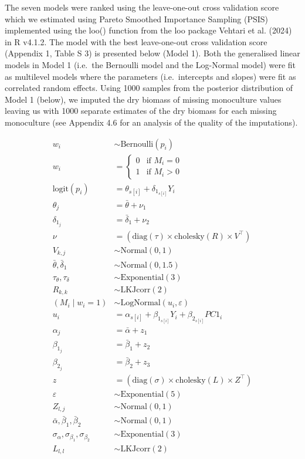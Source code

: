 \documentclass[
  letterpaper,
  DIV=11,
  numbers=noendperiod]{scrartcl}
\begin{document}
The seven models were ranked using the leave-one-out cross validation
score which we estimated using Pareto Smoothed Importance Sampling
(PSIS) implemented using the loo() function from the loo package Vehtari
et al. (2024) in R v4.1.2. The model with the best leave-one-out cross
validation score (Appendix 1, Table S 3) is presented below (Model 1).
Both the generalised linear models in Model 1 (i.e.~the Bernoulli model
and the Log-Normal model) were fit as multilevel models where the
parameters (i.e.~intercepts and slopes) were fit as correlated random
effects. Using 1000 samples from the posterior distribution of Model 1
(below), we imputed the dry biomass of missing monoculture values
leaving us with 1000 separate estimates of the dry biomass for each
missing monoculture (see Appendix 4.6 for an analysis of the quality of
the imputations).

\[
\begin{aligned}
w_i &\sim \text{Bernoulli}(p_i) \\
w_i &= 
\begin{cases}
0 & \text{if } M_i = 0 \\
1 & \text{if } M_i > 0
\end{cases} \\
\text{logit}(p_i) &= \theta_{s[i]} + \delta_{1_{s[i]}} Y_i \\
\theta_j &= \bar{\theta} + \nu_1 \\
\delta_{1_j} &= \bar{\delta}_1 + \nu_2 \\
\nu &= \left( \text{diag}(\tau) \times \text{cholesky}(R) \times V^\top \right) \\
V_{k,j} &\sim \text{Normal}(0, 1) \\
\bar{\theta}, \bar{\delta}_1 &\sim \text{Normal}(0, 1.5) \\
\tau_\theta, \tau_\delta &\sim \text{Exponential}(3) \\
R_{k,k} &\sim \text{LKJcorr}(2) \\
(M_i \mid w_i = 1) &\sim \text{LogNormal}(u_i, \varepsilon) \\
u_i &= \alpha_{s[i]} + \beta_{1_{s[i]}} Y_i + \beta_{2_{s[i]}} PC1_i \\
\alpha_j &= \bar{\alpha} + z_1 \\
\beta_{1_j} &= \bar{\beta}_1 + z_2 \\
\beta_{2_j} &= \bar{\beta}_2 + z_3 \\
z &= \left( \text{diag}(\sigma) \times \text{cholesky}(L) \times Z^\top \right) \\
\varepsilon &\sim \text{Exponential}(5) \\
Z_{l,j} &\sim \text{Normal}(0, 1) \\
\bar{\alpha}, \bar{\beta}_1, \bar{\beta}_2 &\sim \text{Normal}(0, 1) \\
\sigma_\alpha, \sigma_{\beta_1}, \sigma_{\beta_2} &\sim \text{Exponential}(3) \\
L_{l,l} &\sim \text{LKJcorr}(2)
\end{aligned} \tag{Model 1}
\]
\end{document}
